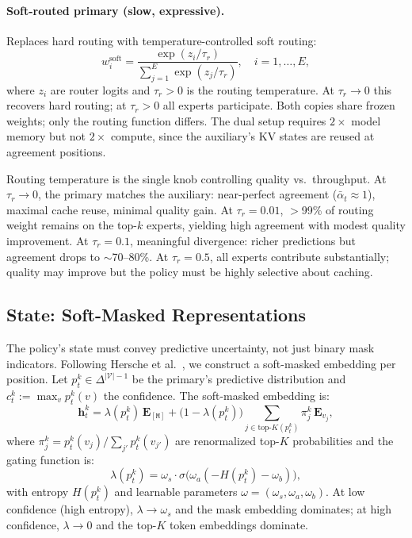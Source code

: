 \documentclass[11pt]{article}
\newcommand{\cV}{\mathcal{V}}
\newcommand{\bh}{\mathbf{h}}
\newcommand{\mask}{\ensuremath{\mathtt{[M]}}}
\begin{document}
\paragraph{Soft-routed primary (slow, expressive).}
Replaces hard routing with temperature-controlled soft routing:
\begin{equation}
    w_i^{\text{soft}} = \frac{\exp(z_i / \tau_r)}{\sum_{j=1}^E \exp(z_j / \tau_r)}, \quad i = 1, \dots, E,
    \label{eq:soft_route}
\end{equation}
where $z_i$ are router logits and $\tau_r > 0$ is the routing temperature.
At $\tau_r \to 0$ this recovers hard routing; at $\tau_r > 0$ all experts participate.
Both copies share frozen weights; only the routing function differs.
The dual setup requires $2\times$ model memory but not $2\times$ compute, since the auxiliary's KV states are reused at agreement positions.

Routing temperature is the single knob controlling quality vs.\ throughput.
At $\tau_r \to 0$, the primary matches the auxiliary: near-perfect agreement ($\bar{\alpha}_t \approx 1$), maximal cache reuse, minimal quality gain.
At $\tau_r = 0.01$, $>$99\% of routing weight remains on the top-$k$ experts, yielding high agreement with modest quality improvement.
At $\tau_r = 0.1$, meaningful divergence: richer predictions but agreement drops to ${\sim}$70--80\%.
At $\tau_r = 0.5$, all experts contribute substantially; quality may improve but the policy must be highly selective about caching.

\subsection{State: Soft-Masked Representations}
\label{sec:state}

The policy's state must convey predictive uncertainty, not just binary mask indicators.
Following Hersche et al.~\cite{hersche2025softmasked}, we construct a soft-masked embedding per position.
Let $p_t^k \in \Delta^{|\cV|-1}$ be the primary's predictive distribution and $c_t^k := \max_v p_t^k(v)$ the confidence.
The soft-masked embedding is:
\begin{equation}
    \bh_t^k = \lambda(p_t^k)\, \mathbf{E}_{\mask} + \bigl(1 - \lambda(p_t^k)\bigr) \sum_{j \in \text{top-}K(p_t^k)} \pi_j^k\, \mathbf{E}_{v_j},
    \label{eq:softmask}
\end{equation}
where $\pi_j^k = p_t^k(v_j) / \sum_{j'} p_t^k(v_{j'})$ are renormalized top-$K$ probabilities and the gating function is:
\begin{equation}
    \lambda(p_t^k) = \omega_s \cdot \sigma\!\bigl(\omega_a(-H(p_t^k) - \omega_b)\bigr),
    \label{eq:gating}
\end{equation}
with entropy $H(p_t^k)$ and learnable parameters $\omega = (\omega_s, \omega_a, \omega_b)$.
At low confidence (high entropy), $\lambda \to \omega_s$ and the mask embedding dominates; at high confidence, $\lambda \to 0$ and the top-$K$ token embeddings dominate.
\end{document}

